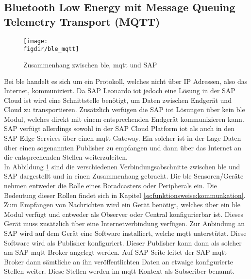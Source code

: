 \subsection{Bluetooth Low Energy mit Message Queuing Telemetry Transport (MQTT)}
\label{ss:interface:ble}

\begin{figure}[!b]
	\centering
	\texttt{[image: \\figdir/ble\_mqtt]}
	\caption{Zusammenhang zwischen \ac{ble}, \ac{mqtt} und SAP \cite[Seite 3f]{Zivkovic20:MQTT} \cite[Seite 230f]{Holtschulte20:IOS}}
	\label{FIG:mqtt}
\end{figure}

\noindent Bei \ac{ble} handelt es sich um ein Protokoll, welches nicht über IP Adressen, also das Internet, kommuniziert. Da SAP Leonardo \ac{iot} jedoch eine Lösung in der SAP Cloud ist wird eine Schnittstelle benötigt, um Daten zwischen Endgerät und Cloud zu transportieren. Zusätzlich verfügen die SAP \ac{iot} Lösungen über kein \ac{ble} Modul, welches direkt mit einem entsprechenden Endgerät kommunizieren kann. SAP verfügt allerdings sowohl in der SAP Cloud Platform \ac{iot} als auch in den SAP Edge Services über einen \ac{mqtt} Gateway. Ein solcher ist in der Lage Daten über einen sogenannten Publisher zu empfangen und dann über das Internet an die entsprechenden Stellen weiterzuleiten.\\

\noindent In Abbildung \ref{FIG:mqtt} sind die verschiedenen Verbindungsabschnitte zwischen \ac{ble} und SAP dargestellt und in einen Zusammenhang gebracht. Die \ac{ble} Sensoren/Geräte nehmen entweder die Rolle eines Boradcasters oder Peripherals ein. Die Bedeutung dieser Rollen findet sich in Kapitel \ref{ss:funktionsweise:kommunkation}. Zum Empfangen von Nachrichten wird ein Gerät benötigt, welches über ein \ac{ble} Modul verfügt und entweder als Observer oder Central konfigurierbar ist. Dieses Gerät muss zusätzlich über eine Internetverbindung verfügen. Zur Anbindung an SAP wird auf dem Gerät eine Software installiert, welche \ac{mqtt} unterstützt. Diese Software wird als Publisher konfiguriert. Dieser Publisher kann dann als solcher am SAP \ac{mqtt} Broker angelegt werden. Auf SAP Seite leitet der SAP \ac{mqtt} Broker dann sämtliche an ihn veröffentlichten Daten an etwaige konfigurierte Stellen weiter. Diese Stellen werden im \ac{mqtt} Kontext als Subscriber benannt.\\


